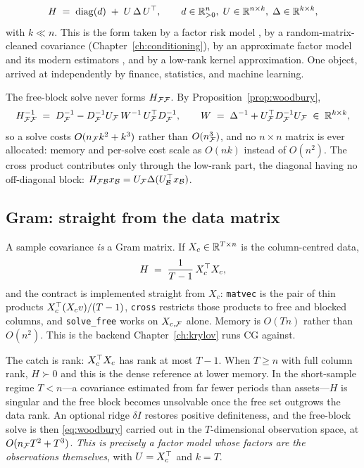 \begin{equation}
\label{eq:factor}
H \;=\; \operatorname{diag}(d) \;+\; U\,\Delta\,U^{\top},
\qquad d \in \mathbb{R}^{n}_{>0},\; U \in \mathbb{R}^{n\times k},\; \Delta \in \mathbb{R}^{k\times k},
\end{equation}
with $k \ll n$. This is the form taken by a factor risk model \cite{sharpe1963}, by a
random-matrix-cleaned covariance (Chapter~\ref{ch:conditioning}), by an approximate
factor model \cite{chamberlain1983} and its modern estimators
\cite{fan2013poet}, and by a low-rank kernel approximation. One object, arrived at
independently by finance, statistics, and machine learning.

The free-block solve never forms $H_{\mathcal{F}\mathcal{F}}$. By Proposition~\ref{prop:woodbury},
\begin{equation}
\label{eq:woodbury}
H_{\mathcal{F}\mathcal{F}}^{-1} \;=\; D_{\mathcal{F}}^{-1} - D_{\mathcal{F}}^{-1} U_{\mathcal{F}}\, W^{-1}\, U_{\mathcal{F}}^{\top} D_{\mathcal{F}}^{-1},
\qquad
W \;=\; \Delta^{-1} + U_{\mathcal{F}}^{\top} D_{\mathcal{F}}^{-1} U_{\mathcal{F}} \;\in\;\mathbb{R}^{k\times k},
\end{equation}
so a solve costs $O(n_{\mathcal{F}} k^2 + k^3)$ rather than $O(n_{\mathcal{F}}^3)$, and no $n\times n$
matrix is ever allocated: memory and per-solve cost scale as $O(nk)$ instead of
$O(n^2)$. The cross product contributes only through the low-rank part, the diagonal
having no off-diagonal block:
$H_{\mathcal{F}\mathcal{B}}x_{\mathcal{B}} = U_{\mathcal{F}}\Delta(U_{\mathcal{B}}^{\top} x_{\mathcal{B}})$.

\subsection{Gram: straight from the data matrix}
\label{sec:gram}

A sample covariance \emph{is} a Gram matrix. If $X_c \in \mathbb{R}^{T\times n}$ is the
column-centred data,
\begin{equation}
\label{eq:gram}
H \;=\; \frac{1}{T-1}\,X_c^{\top} X_c,
\end{equation}
and the contract is implemented straight from $X_c$: \texttt{matvec} is the pair of
thin products $X_c^{\top}(X_c v)/(T-1)$, \texttt{cross} restricts those products to free
and blocked columns, and \texttt{solve\_free} works on $X_{c,\mathcal{F}}$ alone. Memory is
$O(Tn)$ rather than $O(n^2)$. This is the backend Chapter~\ref{ch:krylov} runs CG
against.

The catch is rank: $X_c^{\top} X_c$ has rank at most $T-1$. When $T \ge n$ with full column
rank, $H \succ 0$ and this is the dense reference at lower memory. In the
short-sample regime $T < n$---a covariance estimated from far fewer periods than
assets---$H$ is singular and the free block becomes unsolvable once the free set
outgrows the data rank. An optional ridge $\delta I$ restores positive definiteness,
and the free-block solve is then \eqref{eq:woodbury} carried out in the
$T$-dimensional observation space, at $O(n_{\mathcal{F}} T^2 + T^3)$. \emph{This is precisely a
factor model whose factors are the observations themselves}, with $U = X_c^{\top}$ and
$k = T$.

